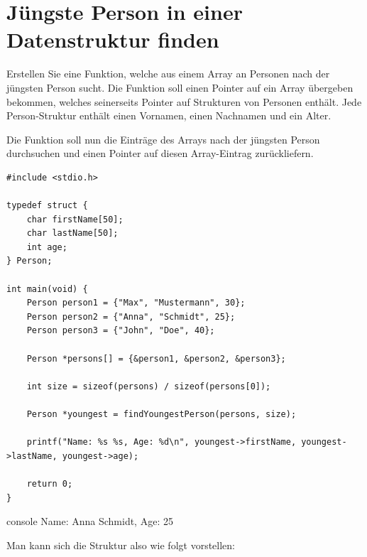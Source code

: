\chapter{Jüngste Person in einer Datenstruktur finden}

\vspace{10pt}

Erstellen Sie eine Funktion, welche aus einem Array an Personen nach der
jüngsten Person sucht. Die Funktion soll einen Pointer auf ein Array übergeben
bekommen, welches seinerseits Pointer auf Strukturen von Personen enthält. Jede
Person-Struktur enthält einen Vornamen, einen Nachnamen und ein Alter.

Die Funktion soll nun die Einträge des Arrays nach der jüngsten Person
durchsuchen und einen Pointer auf diesen Array-Eintrag zurückliefern.

\Vorlage
\begin{verbatim}
#include <stdio.h>

typedef struct {
    char firstName[50];
    char lastName[50];
    int age;
} Person;

int main(void) {
    Person person1 = {"Max", "Mustermann", 30};
    Person person2 = {"Anna", "Schmidt", 25};
    Person person3 = {"John", "Doe", 40};

    Person *persons[] = {&person1, &person2, &person3};

    int size = sizeof(persons) / sizeof(persons[0]);

    Person *youngest = findYoungestPerson(persons, size);

    printf("Name: %s %s, Age: %d\n", youngest->firstName, youngest->lastName, youngest->age);

    return 0;
}
\end{verbatim}

\begin{mybox}[Bildschirmausgabe]{console}
Name: Anna Schmidt, Age: 25
\end{mybox}


Man kann sich die Struktur also wie folgt vorstellen:

